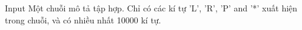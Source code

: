 Input
Một chuỗi mô tả tập hợp. Chỉ có các kí tự 'L', 'R', 'P' and '*' xuất hiện trong chuỗi, và có nhiều nhất 10000 kí tự.